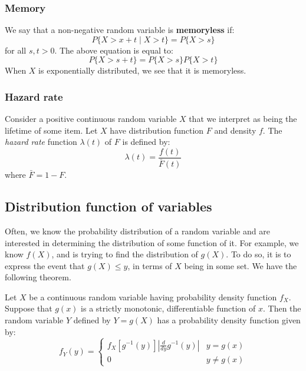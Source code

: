 \subsubsection{Memory}
We say that a non-negative random variable is \textbf{memoryless} if: $$P\{ X>x+t\mid X>t \}=P\{ X>s \}$$ for all $s,t>0$. 
The above equation is equal to: $$P\{ X>s+t \}=P\{ X>s \}P\{ X>t \}$$
When $X$ is exponentially distributed, we see that it is memoryless.
\subsubsection{Hazard rate}
Consider a positive continuous random variable $X$ that we interpret as being the lifetime of some item. Let $X$ have distribution function $F$ and density $f$. The \textit{hazard rate} function $\lambda(t)$ of $F$ is defined by: $$\lambda(t)=\frac{f(t)}{\bar{F}(t)}$$
where $\bar{F}=1-F$.  
\subsection{Distribution function of variables}

Often, we know the probability distribution of a random variable and are interested in determining the distribution of some function of it. For example, we know $f(X)$, and is trying to find the distribution of $g(X)$. To do so, it is to express the event that $g(X)\leq y$, in terms of $X$ being in some set. We have the following theorem. 

\begin{theorem}
    Let $X$ be a continuous random variable having probability density function $f_{{X}}$. Suppose that $g(x)$ is a strictly monotonic, differentiable function of $x$. Then the random variable $Y$ defined by $Y=g(X)$ has a probability density function given by: $$f_{{Y}}(y)=\begin{cases}
         \displaystyle{f_{X}[g^{-1}(y)]\left\lvert  \frac{d}{dy} g^{-1}(y) \right\rvert } & y = g(x)\\
         0 & y \neq g(x)
        \end{cases}$$
\end{theorem}